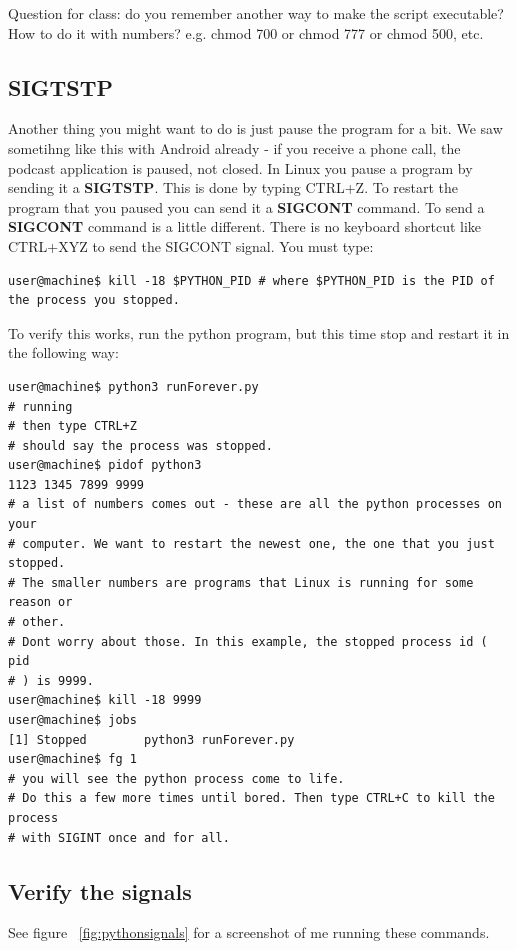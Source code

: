 \documentclass[12pt]{article}
\begin{document}
{\Large Question for class: do you remember another way to make the script
executable? How to do it with numbers? e.g. chmod 700 or chmod 777 or chmod 500,
etc.}

\subsection{SIGTSTP}
Another thing you might want to do is just pause the program for a bit. We saw
sometihng like this with Android already - if you receive a phone call, the
podcast application is paused, not closed. In Linux you pause a program by sending it 
a \textbf{SIGTSTP}. This is done by typing CTRL+Z. To restart the program that you
 paused you can send it a \textbf{SIGCONT} command. To send a \textbf{SIGCONT}
 command is a little different. There is no keyboard shortcut like CTRL+XYZ to
send the SIGCONT signal. You must type:

\begin{lstlisting}[style=term]
user@machine$ kill -18 $PYTHON_PID # where $PYTHON_PID is the PID of the process you stopped.
\end{lstlisting}

To verify this works, run the python program, but this time stop and restart it
in the following way:

\begin{lstlisting}[style=term]
user@machine$ python3 runForever.py
# running 
# then type CTRL+Z
# should say the process was stopped.
user@machine$ pidof python3
1123 1345 7899 9999
# a list of numbers comes out - these are all the python processes on your
# computer. We want to restart the newest one, the one that you just stopped.
# The smaller numbers are programs that Linux is running for some reason or
# other.
# Dont worry about those. In this example, the stopped process id ( pid
# ) is 9999. 
user@machine$ kill -18 9999
user@machine$ jobs
[1] Stopped        python3 runForever.py
user@machine$ fg 1
# you will see the python process come to life.
# Do this a few more times until bored. Then type CTRL+C to kill the process
# with SIGINT once and for all.
\end{lstlisting}

\subsection{Verify the signals}
See figure ~\ref{fig:pythonsignals} for a screenshot of me running these
commands.
\end{document}
